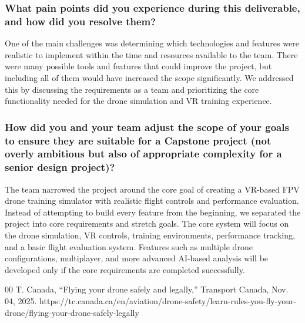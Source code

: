 \documentclass{article}
\begin{document}
\subsubsection*{What pain points did you experience during this deliverable, and how did you resolve them?}

One of the main challenges was determining which technologies and features were realistic to implement within the time and resources available to the team. There were many possible tools and features that could improve the project, but including all of them would have increased the scope significantly. We addressed this by discussing the requirements as a team and prioritizing the core functionality needed for the drone simulation and VR training experience. 

\subsubsection*{How did you and your team adjust the scope of your goals to ensure
    they are suitable for a Capstone project (not overly ambitious but also of
    appropriate complexity for a senior design project)?}

The team narrowed the project around the core goal of creating a VR-based FPV drone training simulator with realistic flight controls and performance evaluation. Instead of attempting to build every feature from the beginning, we separated the project into core requirements and stretch goals. The core system will focus on the drone simulation, VR controls, training environments, performance tracking, and a basic flight evaluation system. Features such as multiple drone configurations, multiplayer, and more advanced AI-based analysis will be developed only if the core requirements are completed successfully.

\begin{thebibliography}{00}
        T. Canada, “Flying your drone safely and legally,” Transport Canada, Nov. 04, 2025. 
        https://tc.canada.ca/en/aviation/drone-safety/learn-rules-you-fly-your-drone/flying-your-drone-safely-legally
\end{thebibliography}
\end{document}
